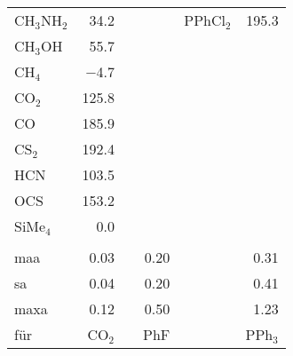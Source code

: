 \begin{table}[ht!]
\begin{tabular}{lr|lr|lr}
    CH$_{3}$NH$_{2}$ & 34.2  &       &  & PPhCl$_{2}$ & 195.3   \\
    CH$_{3}$OH & 55.7  &       &       &       &  \\
    CH$_{4}$   & $-$4.7  &       &       &       &  \\
    CO$_{2}$   & 125.8 &       &       &       &  \\
    CO    & 185.9 &       &       &       &  \\
    CS$_{2}$   & 192.4 &       &       &       &  \\
    HCN   & 103.5 &       &       &       &  \\
    OCS   & 153.2 &       &       &       &  \\
    SiMe$_{4}$ & 0.0   &       &       &       &  \\
          &       &       &       &       &  \\
    \ac{maa}   & 0.03   &    & 0.20   &       & 0.31 \\
    \ac{sa}   & 0.04   &    & 0.20   &       & 0.41 \\
    \ac{maxa} & 0.12 & & 0.50 & & 1.23\\
    für & CO$_2$ & & PhF & & PPh$_3$ 
    \end{tabular}%
  \label{tab:rierror}%
\end{table}%

